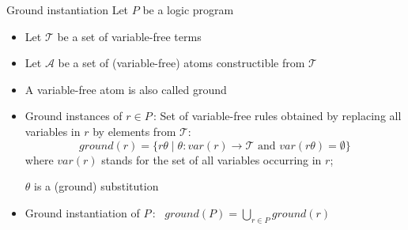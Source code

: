 \begin{frame}{Ground instantiation}
  Let $P$ be a logic program
  \begin{itemize}
  \item<1-> Let $\mathcal{T}$ be a set of variable-free \alert<1-2>{terms}
  \item<1-> Let $\mathcal{A}$ be a set of                (variable-free) \alert<1-2>{atoms} constructible from $\mathcal{T}$
    \smallskip
  \item<3-> A variable-free atom is also called \alert{ground}
    \medskip
  \item<4-> \alert<4>{Ground instances} of $r\in P$\,: Set of variable-free rules obtained by
    replacing all variables in $r$ by elements from $\mathcal{T}$:
    \[
    \mathit{ground}(r)=\{r\theta\mid\theta:\mathit{var}(r)\rightarrow \mathcal{T} \text{ and } \mathit{var}(r\theta)=\emptyset\}
    \]
    where $\mathit{var}(r)$ stands for the set of all variables occurring in $r$;

    $\theta$ is a (ground) substitution
    \medskip
  \item<5-> \alert{Ground instantiation} of $P$\,: \
    \(
    \mathit{ground}(P)=\textstyle\bigcup_{r\in P}\mathit{ground}(r)
    \)
  \end{itemize}
\end{frame}
